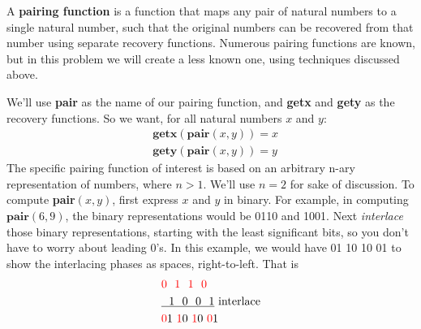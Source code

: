 \documentclass[12pt,letterpaper,boxed,cm]{hmcpset}
\newcommand{\tb}[1]{\textbf{#1}}
\renewcommand{\t}[1]{\text{#1}}
\begin{document}

\begin{problem}[1.]
    [10 points] A \tb{pairing function} is a function that maps any pair of natural numbers to a single natural number, such that the original numbers can be recovered from that number using separate recovery functions. Numerous pairing functions are known, but in this problem we will create a less known one, using techniques discussed above.

    We'll use \tb{pair} as the name of our pairing function, and \tb{getx} and \tb{gety} as the recovery functions. So we want, for all natural numbers $x$ and $y$:
    \begin{align*}
        &\tb{getx}(\tb{pair}(x, y)) = x\\
        &\tb{gety}(\tb{pair}(x, y)) = y
    \end{align*}
    The specific pairing function of interest is based on an arbitrary n-ary representation of numbers, where $n > 1$. We'll use $n = 2$ for sake of discussion. To compute \tb{pair}$(x, y)$, first express $x$ and $y$ in binary. For example, in computing $\tb{pair}(6, 9)$, the binary representations would be 0110 and 1001. Next \emph{interlace} those binary representations, starting with the least significant bits, so you don't have to worry about leading 0's. In this example, we would have 01 10 10 01 to show the interlacing phases as spaces, right-to-left. That is
    \begin{align*}
        &\textcolor{red}{0~~1~~1~~0}\\
        &\underline{~~1~~0~~0~~1}~\t{interlace}\\
        &\textcolor{red}{0}1~\textcolor{red}{1}0~\textcolor{red}{1}0~\textcolor{red}{0}1
    \end{align*}


\end{problem}
\end{document}
